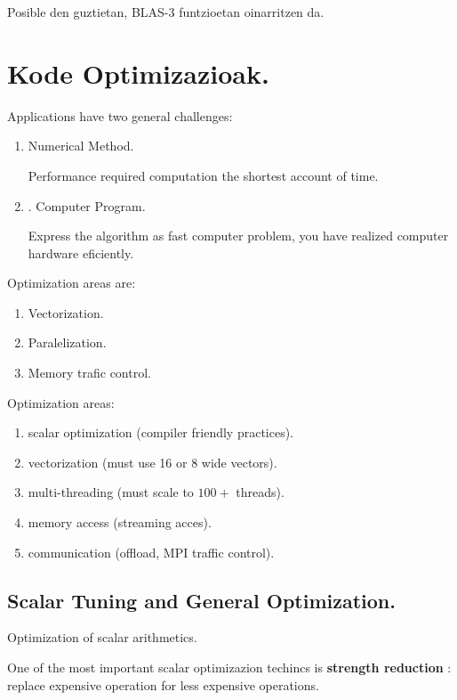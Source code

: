Posible den guztietan, BLAS-3 funtzioetan oinarritzen da.

\section{Kode Optimizazioak.}

Applications have two general challenges:
\begin{enumerate}
\item Numerical Method.

Performance required computation the shortest account of time.

\item. Computer Program.

Express the algorithm as fast computer problem, you have realized computer hardware eficiently.

\end{enumerate}

Optimization areas are:
\begin{enumerate}
\item Vectorization.
\item Paralelization.
\item Memory trafic control.
\end{enumerate}

Optimization areas:
\begin{enumerate}
\item scalar optimization (compiler friendly practices).

\item vectorization (must use 16 or 8 wide vectors).

\item multi-threading (must  scale to $100+$ threads).

\item memory access (streaming acces).

\item communication (offload, MPI traffic control).

\end{enumerate}


\subsection{Scalar Tuning and General Optimization.}

Optimization of scalar arithmetics.

One of the most important scalar optimizazion techincs is  \textbf{strength reduction} : replace expensive operation for less expensive operations.

